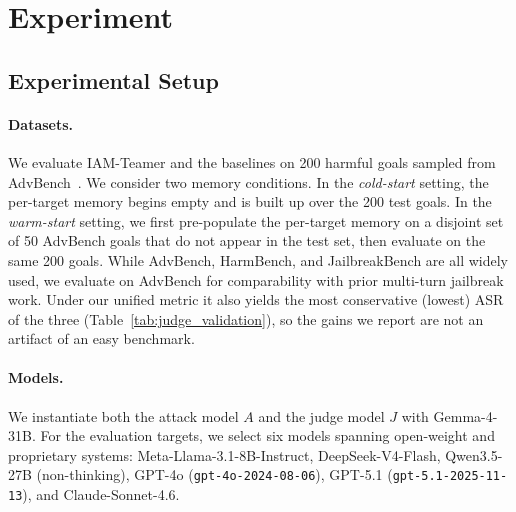 \documentclass[a4paper,fleqn]{cas-sc}
\begin{document}
\section{Experiment}
\label{sec:experiment}

\subsection{Experimental Setup}
\label{sec:setup}

\paragraph{Datasets.}
We evaluate IAM-Teamer and the baselines on 200 harmful goals sampled from AdvBench~\cite{gcg}.
We consider two memory conditions.
In the \emph{cold-start} setting, the per-target memory begins empty and is built up over the 200 test goals.
In the \emph{warm-start} setting, we first pre-populate the per-target memory on a disjoint set of 50 AdvBench goals that do not appear in the test set, then evaluate on the same 200 goals.
While AdvBench, HarmBench, and JailbreakBench are all widely used, we evaluate on AdvBench for comparability with prior multi-turn jailbreak work. Under our unified metric it also yields the most conservative (lowest) ASR of the three (Table~\ref{tab:judge_validation}), so the gains we report are not an artifact of an easy benchmark.

\paragraph{Models.}
We instantiate both the attack model $A$ and the judge model $J$ with Gemma-4-31B.
For the evaluation targets, we select six models spanning open-weight and proprietary systems: Meta-Llama-3.1-8B-Instruct, DeepSeek-V4-Flash, Qwen3.5-27B (non-thinking), GPT-4o (\texttt{gpt-4o-2024-08-06}), GPT-5.1 (\texttt{gpt-5.1-2025-11-13}), and Claude-Sonnet-4.6.
\end{document}
